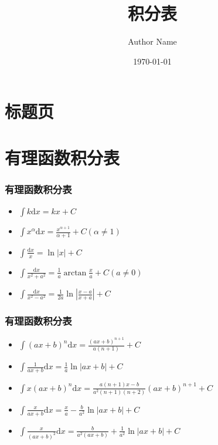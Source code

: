 \documentclass[UTF8, aspectratio = 169, fontsize = 12, hyperref]{ctexbeamer}
\title{积分表}
\author{Author Name}
\date{\today}
\begin{document}
    \section{标题页}
    \frame{\maketitle}
    \section{有理函数积分表}
    \begin{frame}
        \frametitle{有理函数积分表}
        \begin{itemize}
            \item $\int{k}\mathrm{d}x=kx+C$
            \item $\int{x^{\alpha}}\mathrm{d}x=\frac{x^{\alpha+1}}{\alpha+1}+C (\alpha \ne 1)$
            \item $\int{\frac{\mathrm{d}x}{x}}=\ln{|x|}+C$
            \item $\int{\frac{\mathrm{d}x}{x^2+a^2}}=\frac{1}{a}\arctan{\frac{x}{a}}+C (a \ne 0)$
            \item $\int{\frac{\mathrm{d}x}{x^2-a^2}}=\frac{1}{2a}\ln{|\frac{x-a}{x+a}|}+C$
        \end{itemize}
    \end{frame}
    \begin{frame}
        \frametitle{有理函数积分表}
        \begin{itemize}
            \item $\int{(ax+b)^n}\mathrm{d}x=\frac{(ax+b)^{n+1}}{a(n+1)}+C$
            \item $\int{\frac{1}{ax+b}}\mathrm{d}x=\frac{1}{a}\ln{|ax+b|}+C$
            \item $\int{x(ax+b)^n}\mathrm{d}x=\frac{a(n+1)x-b}{a^2(n+1)(n+2)}(ax+b)^{n+1}+C$
            \item $\int{\frac{x}{ax+b}}\mathrm{d}x=\frac{x}{a}-\frac{b}{a^2}\ln{|ax+b|}+C$
            \item $\int{\frac{x}{(ax+b)^2}}\mathrm{d}x=\frac{b}{a^2(ax+b)}+\frac{1}{a^2}\ln{|ax+b|}+C$
        \end{itemize}
    \end{frame}
\end{document}

